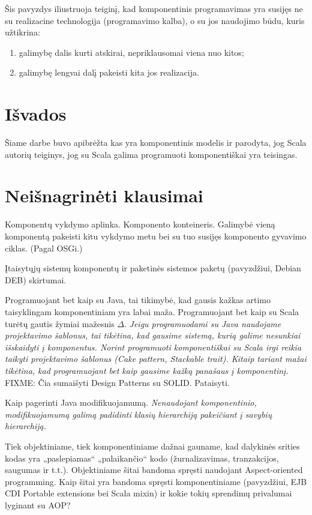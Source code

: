Šis pavyzdys iliustruoja teiginį, kad komponentinis programavimas yra
susijęs ne su realizacine technologija (programavimo kalba), o su
jos naudojimo būdu, kuris užtikrina:
\begin{enumerate}
  \item galimybę dalis kurti atskirai, nepriklausomai viena nuo kitos;
  \item galimybę lengvai dalį pakeisti kita jos realizacija.
\end{enumerate}

\chapter{Išvados}

Šiame darbe buvo apibrėžta kas yra komponentinis modelis ir parodyta,
jog Scala autorių teiginys, jog su Scala galima programuoti
komponentiškai yra teisingas.

\chapter{Neišnagrinėti klausimai}

Komponentų vykdymo aplinka. Komponento konteineris. Galimybė vieną
komponentą pakeisti kitu vykdymo metu bei su tuo susijęs komponento
gyvavimo ciklas. (Pagal OSGi.)

Įtaisytųjų  sistemų komponentų ir paketinės sistemos
paketų (pavyzdžiui, Debian DEB) skirtumai.

Programuojant bet kaip su Java, tai tikimybė, kad gausis kažkas artimo
taisyklingam komponentiniam yra labai maža. Programuojant bet kaip su
Scala turėtų gautis žymiai mažesnis $\Delta$. \emph{Jeigu programuodami
su Java naudojame projektavimo šablonus, tai tikėtina, kad gausime
sistemą, kurią galime nesunkiai išskaidyti į komponentus. Norint
programuoti komponentiškai su Scala irgi reikia taikyti projektavimo
šablonus (Cake pattern, Stackable trait). Kitaip tariant mažai tikėtina,
kad programuojant bet kaip gausime kažką panašaus į komponentinį.}
FIXME: Čia sumaišyti Design Patterns su SOLID. Pataisyti.

Kaip pagerinti Java modifikuojamumą. \emph{Nenaudojant komponentinio,
modifikuojamumą galimą padidinti klasių hierarchiją pakeičiant
į savybių hierarchiją.}

Tiek objektiniame, tiek komponentiniame dažnai gauname, kad dalykinės
srities kodas yra „paslepiamas“ „palaikančio“ kodo (žurnalizavimas,
tranzakcijos, saugumas ir t.t.). Objektiniame šitai bandoma spręsti
naudojant Aspect-oriented programming. Kaip šitai yra bandoma
spręsti komponentiniame (pavyzdžiui, EJB CDI Portable extensions
bei Scala mixin) ir kokie tokių sprendimų privalumai lyginant su AOP?

